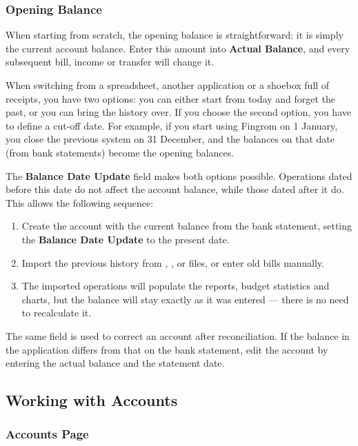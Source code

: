 \subsubsection{Opening Balance}
\label{account:balance}

When starting from scratch, the opening balance is straightforward: it is simply the current
account balance. Enter this amount into \textbf{Actual Balance}, and every subsequent bill,
income or transfer will change it.

When switching from a spreadsheet, another application or a shoebox full of receipts, you
have two options: you can either start from today and forget the past, or you can bring the
history over. If you choose the second option, you have to define a cut-off date. For
example, if you start using Fingrom on 1 January, you close the previous system on 31
December, and the balances on that date (from bank statements) become the opening balances.

The \textbf{Balance Date Update} field makes both options possible. Operations dated before
this date do not affect the account balance, while those dated after it do. This allows the
following sequence:

\begin{enumerate}
  \item Create the account with the current balance from the bank statement, setting the
  \textbf{Balance Date Update} to the present date.
  \item Import the previous history from , , or  files, or enter old
  bills manually.
  \item The imported operations will populate the reports, budget statistics and charts, but
  the balance will stay exactly as it was entered — there is no need to recalculate it.
\end{enumerate}

\noindent The same field is used to correct an account after reconciliation. If the balance
in the application differs from that on the bank statement, edit the account by entering the
actual balance and the statement date.


\subsection{Working with Accounts}

\subsubsection{Accounts Page}

